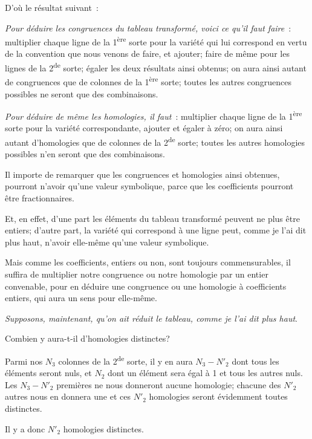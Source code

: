 \documentclass{article}
\begin{document}
D'où le résultat suivant~:


\emph{Pour déduire les congruences du tableau transformé, voici ce qu'il faut faire}~: multiplier chaque ligne de la 1\textsuperscript{ère} sorte pour la variété qui lui correspond en vertu de la convention que nous venons de faire, et ajouter; faire de même pour les lignes de la 2\textsuperscript{de} sorte; égaler les deux résultats ainsi obtenus; on aura ainsi autant de congruences que de colonnes de la 1\textsuperscript{ère} sorte; toutes les autres congruences possibles ne seront que des combinaisons.

\emph{Pour déduire de même les homologies, il faut}~: multiplier chaque ligne de la 1\textsuperscript{ère} sorte pour la variété correspondante, ajouter et égaler à zéro; on aura ainsi autant d'homologies que de colonnes de la 2\textsuperscript{de} sorte; toutes les autres homologies possibles n'en seront que des combinaisons.

Il importe de remarquer que les congruences et homologies ainsi obtenues, pourront n'avoir qu'une valeur symbolique, parce que les coefficients pourront être fractionnaires.

Et, en effet, d'une part les éléments du tableau transformé peuvent ne plus être entiers; d'autre part, la variété qui correspond à une ligne peut, comme je l'ai dit plus haut, n'avoir elle-même qu'une valeur symbolique.

Mais comme les coefficients, entiers ou non, sont toujours commensurables, il suffira de multiplier notre congruence ou notre homologie par un entier convenable, pour en déduire une congruence ou une homologie à coefficients entiers, qui aura un sens pour elle-même.

\emph{Supposons, maintenant, qu'on ait réduit le tableau, comme je l'ai dit plus haut}.

Combien y aura-t-il d'homologies distinctes?

Parmi nos $N_{3}$ colonnes de la 2\textsuperscript{de} sorte, il y en aura $N_{3} - N'_{2}$ dont tous les éléments seront nuls, et $N_{2}$ dont un élément sera égal à 1 et tous les autres nuls. Les $N_{3} - N'_{2}$ premières ne nous donneront aucune homologie; chacune des $N'_{2}$ autres nous en donnera une et ces $N'_{2}$ homologies seront évidemment toutes distinctes.

Il y a donc $N'_{2}$ homologies distinctes.
\end{document}
